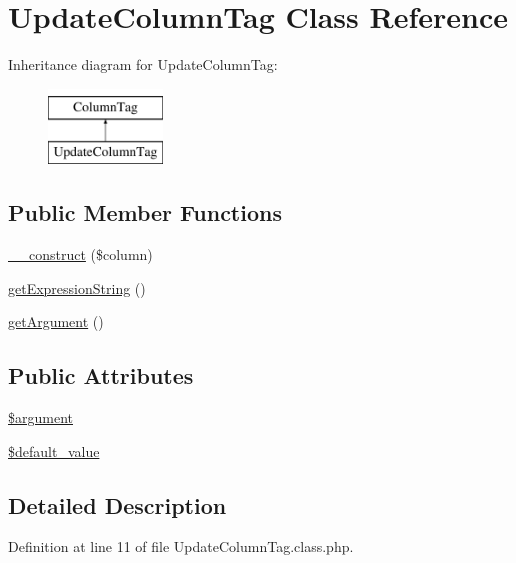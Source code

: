 \hypertarget{classUpdateColumnTag}{\section{Update\-Column\-Tag Class Reference}
\label{classUpdateColumnTag}
}
Inheritance diagram for Update\-Column\-Tag\-:\begin{figure}[H]
\begin{center}
\leavevmode
\includegraphics[height=2.000000cm]{classUpdateColumnTag}
\end{center}
\end{figure}
\subsection*{Public Member Functions}
\begin{DoxyCompactItemize}
\item 
\hyperlink{classUpdateColumnTag_acbab78cc4501b58cffa42b4894951399}{\-\_\-\-\_\-construct} (\$column)
\item 
\hyperlink{classUpdateColumnTag_a16ab982f05143f8e0c4550f02ebe2357}{get\-Expression\-String} ()
\item 
\hyperlink{classUpdateColumnTag_a6b6cca5c598d435f3f40caf96f5dea4a}{get\-Argument} ()
\end{DoxyCompactItemize}
\subsection*{Public Attributes}
\begin{DoxyCompactItemize}
\item 
\hyperlink{classUpdateColumnTag_a3312163ccabc7246e2f397390648b75b}{\$argument}
\item 
\hyperlink{classUpdateColumnTag_a63420aa5c0b8c374a4f29d054abbda76}{\$default\-\_\-value}
\end{DoxyCompactItemize}


\subsection{Detailed Description}


Definition at line 11 of file Update\-Column\-Tag.\-class.\-php.



